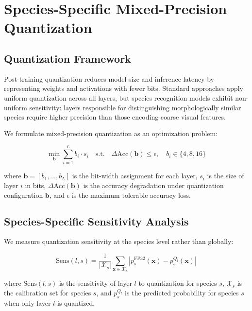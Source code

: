 \section{Species-Specific Mixed-Precision Quantization}

\label{sec:quantization}

\subsection{Quantization Framework}

Post-training quantization reduces model size and inference latency by representing weights and activations with fewer bits.
Standard approaches apply uniform quantization across all layers, but species recognition models exhibit non-uniform sensitivity: layers responsible for distinguishing morphologically similar species require higher precision than those encoding coarse visual features.

We formulate mixed-precision quantization as an optimization problem:

\begin{equation}
    \min_{\mathbf{b}} \sum_{i=1}^{L} b_i \cdot s_i \quad \text{s.t.} \quad \Delta\text{Acc}(\mathbf{b}) \leq \epsilon, \quad b_i \in \{4, 8, 16\}
\end{equation}

\noindent where $\mathbf{b} = [b_1, \ldots, b_L]$ is the bit-width assignment for each layer, $s_i$ is the size of layer $i$ in bits, $\Delta\text{Acc}(\mathbf{b})$ is the accuracy degradation under quantization configuration $\mathbf{b}$, and $\epsilon$ is the maximum tolerable accuracy loss.

\subsection{Species-Specific Sensitivity Analysis}

We measure quantization sensitivity at the species level rather than globally:

\begin{equation}
    \text{Sens}(l, s) = \frac{1}{|\mathcal{X}_s|} \sum_{\mathbf{x} \in \mathcal{X}_s} |p_s^{\text{FP32}}(\mathbf{x}) - p_s^{Q_l}(\mathbf{x})|
\end{equation}

\noindent where $\text{Sens}(l, s)$ is the sensitivity of layer $l$ to quantization for species $s$, $\mathcal{X}_s$ is the calibration set for species $s$, and $p_s^{Q_l}$ is the predicted probability for species $s$ when only layer $l$ is quantized.

